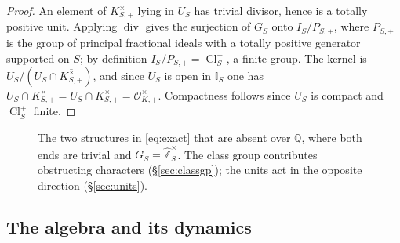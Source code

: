 \documentclass[11pt]{amsart}
\numberwithin{equation}{section}
\theoremstyle{definition}
\theoremstyle{remark}
\newcommand{\Z}{\mathbb{Z}}
\newcommand{\Q}{\mathbb{Q}}
\newcommand{\hZ}{\widehat{\Z}}
\newcommand{\Cl}{\operatorname{Cl}}
\newcommand{\cO}{\mathcal{O}}
\newcommand{\Idl}{\mathbb{I}}
\begin{document}
\begin{proof}
An element of $K^\times_{S,+}$ lying in $U_S$ has trivial divisor, hence is a
totally positive unit. Applying $\operatorname{div}$ gives the surjection of
$G_S$ onto $I_S/P_{S,+}$, where $P_{S,+}$ is the group of principal fractional
ideals with a totally positive generator supported on $S$; by definition
$I_S/P_{S,+}=\Cl^+_S$, a finite group. The kernel is
$U_S/(U_S\cap\overline{K^\times_{S,+}})$, and since $U_S$ is open in $\Idl_S$ one has
$U_S\cap\overline{K^\times_{S,+}}=\overline{U_S\cap K^\times_{S,+}}=\overline{\cO^\times_{K,+}}$.
Compactness follows since $U_S$ is compact and $\Cl^+_S$ finite.
\end{proof}

\begin{figure}[htbp]
\centering
{}
\caption{The two structures in \eqref{eq:exact} that are absent over $\Q$, where both
ends are trivial and $G_S=\hZ_S^\times$. The class group contributes obstructing
characters (\S\ref{sec:classgp}); the units act in the opposite direction
(\S\ref{sec:units}).}
\label{fig:exact}
\end{figure}

\subsection{The algebra and its dynamics}
\end{document}
